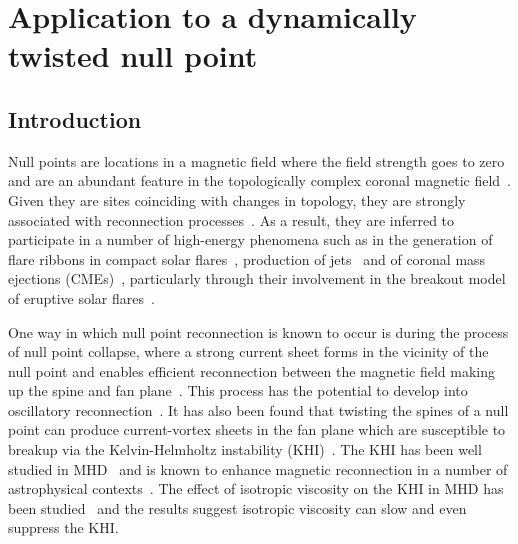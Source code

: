 \chapter{Application to a dynamically twisted null point}
\label{chp:null_point_khi}

\graphicspath{{images/null_point_khi/}}

\section{Introduction}

Null points are locations in a magnetic field where the field strength goes to zero and are an abundant feature in the topologically complex coronal magnetic field~\cite{edwardsNullPointDistribution2015}. Given they are sites coinciding with changes in topology, they are strongly associated with reconnection processes~\cite{yangImagingSpectralStudy2020,sunHOTSPINELOOPS2013}. As a result, they are inferred to participate in a number of high-energy phenomena such as in the generation of flare ribbons in compact solar flares~\cite{massonNATUREFLARERIBBONS2009,pontinWhyAreFlare2016a}, production of jets~\cite{moreno-insertisPLASMAJETSERUPTIONS2013} and of coronal mass ejections (CMEs)~\cite{barnesRelationshipCoronalMagnetic2007,zouContinuousNullPointMagnetic2020}, particularly through their involvement in the breakout model of eruptive solar flares~\cite{macleanTopologicalAnalysisMagnetic2005}.

One way in which null point reconnection is known to occur is during the process of null point collapse, where a strong current sheet forms in the vicinity of the null point and enables efficient reconnection between the magnetic field making up the spine and fan plane~\cite{thurgoodImplosiveCollapseMagnetic2018}. This process has the potential to develop into oscillatory reconnection~\cite{thurgoodThreedimensionalOscillatoryMagnetic2017}. It has also been found that twisting the spines of a null point can produce current-vortex sheets in the fan plane which are susceptible to breakup via the Kelvin-Helmholtz instability (KHI)~\cite{wyperKelvinHelmholtzInstabilityCurrentvortex2013}. The KHI has been well studied in MHD~\cite{chandrasekharHydrodynamicHydromagneticStability1981,einaudiResistiveInstabilitiesFlowing1986} and is known to enhance magnetic reconnection in a number of astrophysical contexts~\cite{minEffectsMagneticReconnection1997,kowalKelvinHelmholtzTearingInstability2020}. The effect of isotropic viscosity on the KHI in MHD has been studied~\cite{howsonEffectsResistivityViscosity2017,roedigerViscousKelvinHelmholtzInstabilities2013a,wyperKelvinHelmholtzInstabilityCurrentvortex2013} and the results suggest isotropic viscosity can slow and even suppress the KHI.

